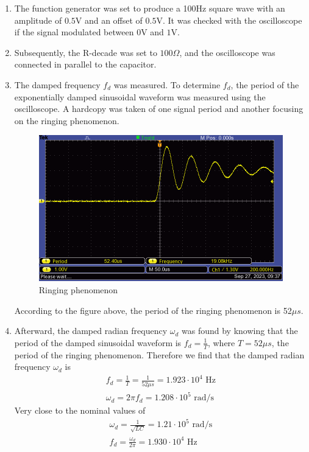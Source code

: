 \begin{enumerate}
    \item The function generator was set to produce a 100Hz square wave with an amplitude of $0.5\text{V}$ and an offset of $0.5\text{V}$. It was checked with the oscilloscope if the signal modulated between $0\text{V}$ and $1\text{V}$.

    \item Subsequently, the R-decade was set to $100\Omega$, and the oscilloscope was connected in parallel to the capacitor.

    \item The damped frequency $f_d$ was measured. To determine $f_d$, the period of the exponentially damped sinusoidal waveform was measured using the oscilloscope. A hardcopy was taken of one signal period and another focusing on the ringing phenomenon.
          \begin{figure}[H]
              \centering
              \includegraphics[width=0.8\linewidth]{images/ringing_phenomenon.png}
              \caption{Ringing phenomenon}
              \label{fig:ringing_phenomenon}
          \end{figure}
          According to the figure above, the period of the ringing phenomenon is 52$\mu s$.

    \item Afterward, the damped radian frequency $\omega_d$ was found by knowing that the period of the damped sinusoidal waveform is $f_d = \frac{1}{T}$, where $T=52\mu s$, the period of the ringing phenomenon. Therefore we find that the damped radian frequency $\omega_d$ is
          \begin{equation}
              \begin{gathered}
                  f_d = \frac{1}{T} = \frac{1}{52\mu s} = 1.923 \cdot 10^4 \text{ Hz} \\
                  \omega_d = 2\pi f_d = 1.208 \cdot 10^5 \text{ rad/s}
              \end{gathered}
          \end{equation}
          Very close to the nominal values of
          \begin{equation}
              \begin{gathered}
                  \omega_d = \frac{1}{\sqrt{LC}} = 1.21 \cdot 10^5 \text{ rad/s} \\
                  f_d = \frac{\omega_d}{2\pi} = 1.930 \cdot 10^4 \text{ Hz}
              \end{gathered}
          \end{equation}


\end{enumerate}
